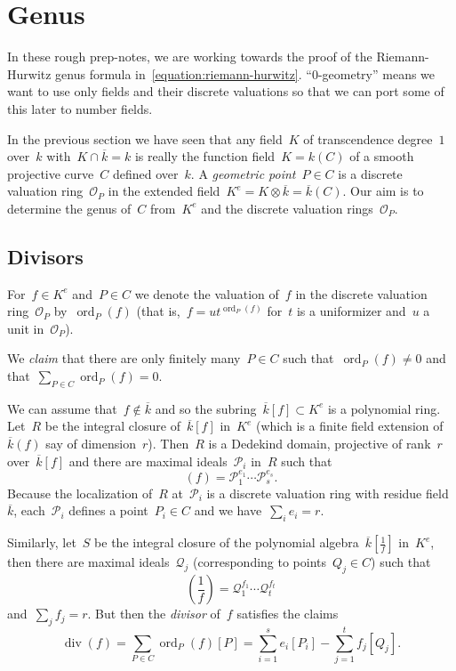 \section{Genus}
\label{section:genus}
In these rough prep-notes, we are working towards the proof of the Riemann-Hurwitz genus formula in~\eqref{equation:riemann-hurwitz}. ``0-geometry'' means we want to use only fields and their discrete valuations so that we can port some of this later to number fields.

In the previous section we have seen that any field~$K$ of transcendence degree~$1$ over~$k$ with~$K \cap \overline{k} = k$ is really the function field~$K = k(C)$ of a smooth projective curve~$C$ defined over~$k$. A \emph{geometric point}~$P \in C$ is a discrete valuation ring~$\mathcal{O}_P$ in the extended field~$K^e = K \otimes \overline{k} = \overline{k}(C)$. Our aim is to determine the genus of~$C$ from~$K^e$ and the discrete valuation rings~$\mathcal{O}_P$.

\subsection{Divisors}
For~$f \in K^e$ and~$P \in C$ we denote the valuation of~$f$ in the discrete valuation ring~$\mathcal{O}_P$ by~$\operatorname{ord}_P(f)$ (that is,~$f = u t^{\operatorname{ord}_P(f)}$ for~$t$ is a uniformizer and~$u$ a unit in~$\mathcal{O}_P$). 

We \emph{claim} that there are only finitely many~$P \in C$ such that~$\operatorname{ord}_P(f) \not= 0$ and that~$\sum_{P \in C} \operatorname{ord}_P(f) = 0$.

We can assume that~$f \notin \overline{k}$ and so the subring~$\overline{k}[f] \subset K^e$ is a polynomial ring. Let~$R$ be the integral closure of~$\overline{k}[f]$ in~$K^e$ (which is a finite field extension of~$\overline{k}(f)$ say of dimension~$r$). Then~$R$ is a Dedekind domain, projective of rank~$r$ over~$\overline{k}[f]$ and there are maximal ideals~$\mathcal{P}_i$ in~$R$ such that
\begin{equation}
  (f) = \mathcal{P}_1^{e_1} \cdots \mathcal{P}_s^{e_s}.
\end{equation}
Because the localization of~$R$ at~$\mathcal{P}_i$ is a discrete valuation ring with residue field~$\overline{k}$, each~$\mathcal{P}_i$ defines a point~$P_i \in C$ and we have~$\sum_i e_i = r$.

Similarly, let~$S$ be the integral closure of the polynomial algebra~$\overline{k}[\frac{1}{f}]$ in~$K^e$, then there are maximal ideals~$\mathcal{Q}_j$ (corresponding to points~$Q_j \in C$) such that
\begin{equation}
  \left(\frac{1}{f}\right) = \mathcal{Q}_1^{f_1} \cdots \mathcal{Q}_t^{f_t}
\end{equation}
and~$\sum_j f_j = r$. But then the \emph{divisor} of~$f$ satisfies the claims
\begin{equation}
  \operatorname{div}(f) = \sum_{P \in C} \operatorname{ord}_P(f) [P] = \sum_{i=1}^s e_i [P_i] - \sum_{j=1}^t f_j [Q_j].
\end{equation}



